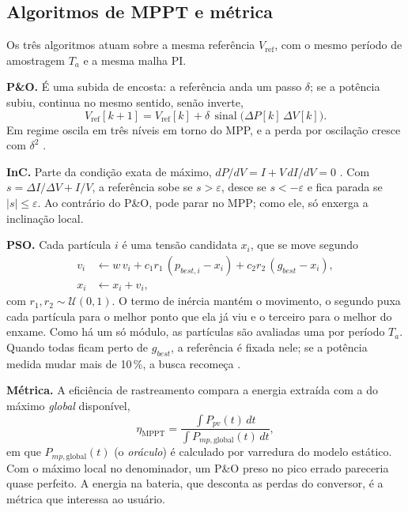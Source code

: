 \documentclass[3p,authoryear]{elsarticle}
\newcommand{\Vref}{V_{\mathrm{ref}}}
\newcommand{\etaM}{\eta_{\mathrm{MPPT}}}
\begin{document}
\subsection{Algoritmos de MPPT e métrica}
\label{sec:fund_mppt}

Os três algoritmos atuam sobre a mesma referência $\Vref$, com o mesmo período de amostragem
$T_a$ e a mesma malha PI.

\textbf{P\&O.} É uma subida de encosta: a referência anda um passo $\delta$; se a potência
subiu, continua no mesmo sentido, senão inverte,
\begin{equation}
\Vref[k+1] = \Vref[k] + \delta\,\operatorname{sinal}\big(\Delta P[k]\,\Delta V[k]\big).
\label{eq:po}
\end{equation}
Em regime oscila em três níveis em torno do MPP, e a perda por oscilação cresce com
$\delta^2$ \citep{femia}.

\textbf{InC.} Parte da condição exata de máximo, $dP/dV = I + V\,dI/dV = 0$
\citep{hussein}. Com $s = \Delta I/\Delta V + I/V$, a referência sobe se $s > \varepsilon$,
desce se $s < -\varepsilon$ e fica parada se $|s| \le \varepsilon$. Ao contrário do P\&O, pode
parar no MPP; como ele, só enxerga a inclinação local.

\textbf{PSO.} Cada partícula $i$ é uma tensão candidata $x_i$, que se move segundo
\citep{kennedy}
\begin{align}
v_i &\leftarrow w\,v_i + c_1 r_1\,(p_{best,i}-x_i) + c_2 r_2\,(g_{best}-x_i), \label{eq:pso1}\\
x_i &\leftarrow x_i + v_i, \label{eq:pso2}
\end{align}
com $r_1, r_2 \sim \mathcal U(0,1)$. O termo de inércia \citep{shi} mantém o movimento, o segundo puxa
cada partícula para o melhor ponto que ela já viu e o terceiro para o melhor do enxame. Como
há um só módulo, as partículas são avaliadas uma por período $T_a$. Quando todas ficam perto
de $g_{best}$, a referência é fixada nele; se a potência medida mudar mais de 10\,\%, a busca
recomeça \citep{ishaquepso2}.

\textbf{Métrica.} A eficiência de rastreamento compara a energia extraída com a do máximo
\emph{global} disponível,
\begin{equation}
\etaM = \frac{\int P_{pv}(t)\,dt}{\int P_{mp,\mathrm{global}}(t)\,dt},
\label{eq:eta}
\end{equation}
em que $P_{mp,\mathrm{global}}(t)$ (o \emph{oráculo}) é calculado por varredura do modelo
estático. Com o máximo local no denominador, um P\&O preso no pico errado pareceria quase
perfeito. A energia na bateria, que desconta as perdas do conversor, é a métrica que
interessa ao usuário.
\end{document}
